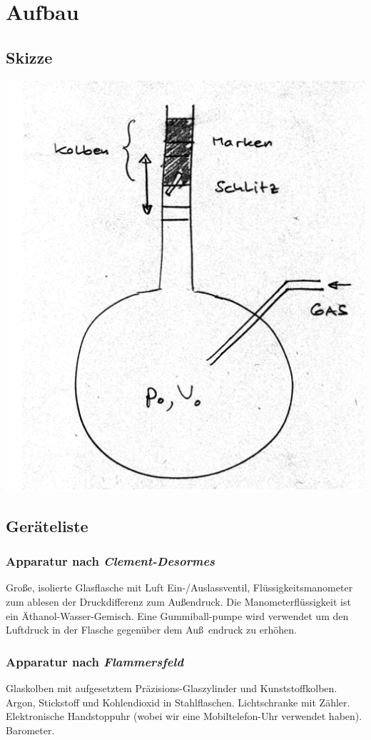 \documentclass[11pt,a4paper]{article}
\begin{document}
  \section{Aufbau}
  \subsection{Skizze}
  \includegraphics{skizzeIsentropenindex.png}
  \subsection{Ger\"ateliste}
  \subsubsection{Apparatur nach \itshape{Clement-Desormes}\/}
  Gro{\ss}e, isolierte Glasflasche mit Luft Ein-/Auslassventil,
  Fl\"ussigkeitsmanometer zum ablesen der Druckdifferenz zum Au{\ss}endruck. Die 
  Manometerfl\"ussigkeit ist ein \"Athanol-Wasser-Gemisch. Eine Gummiball-pumpe
  wird verwendet um den Luftdruck in der Flasche gegen\"uber dem Au\ss~endruck zu 
  erh\"ohen.
  \subsubsection{Apparatur nach \itshape{Flammersfeld}\/}
  Glaskolben mit aufgesetztem Pr\"azisions-Glaszylinder und Kunststoffkolben. Argon, 
  Stickstoff und Kohlendioxid in Stahlflaschen. Lichtschranke mit Z\"ahler. Elektronische
  Handstoppuhr (wobei wir eine Mobiltelefon-Uhr verwendet haben). Barometer.
\end{document}

